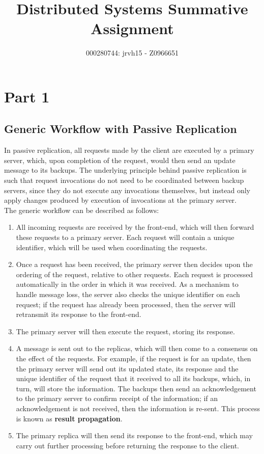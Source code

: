\documentclass[11pt]{article}
\title{Distributed Systems Summative Assignment}
\author{000280744: jrvh15 - Z0966651}
\begin{document}
\maketitle

\section*{Part 1}
\subsection*{Generic Workflow with Passive Replication} 
In passive replication, all requests made by the client are executed by a 
primary server, which, upon completion of the request, would then send an 
update message to its backups. The underlying principle behind passive 
replication is such that request invocations do not need to be coordinated 
between backup servers, since they do not execute any invocations themselves, 
but instead only apply changes produced by execution of invocations at the 
primary server.\\

The generic workflow can be described as follows:
\begin{enumerate}
 \item All incoming requests are received by the front-end, which will then 
forward these requests to a primary server. Each request will contain a unique 
identifier, which will be used when coordinating the requests.
\item Once a request has been received, the primary server then decides upon 
the ordering of the request, relative to other requests. Each request is 
processed automatically in the order in which it was received. As a 
mechanism to handle message loss, the server also checks the unique identifier 
on each request; if the request has already been processed, then the server 
will retransmit its response to the front-end.
\item The primary server will then execute the request, storing its response.
\item A message is sent out to the replicas, which will then come to a 
consensus on the effect of the requests. For example, if the request is for an 
update, then the primary server will send out its updated state, its response 
and the unique identifier of the request that it received to all its backups, 
which, in turn, will store the information. The backups then send an 
acknowledgement to the primary server to confirm receipt of the information; if 
an acknowledgement is not received, then the information is re-sent. This 
process is known as \textbf{result propagation}. 
\item The primary replica will then send its response to the front-end, which 
may carry out further processing before returning the response to the client.
\end{enumerate}
\end{document}
